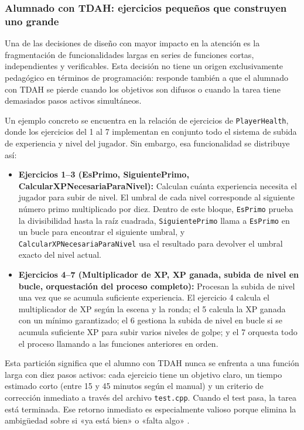 \documentclass[a4paper,12pt]{article}
\begin{document}
\subsubsection*{Alumnado con TDAH: ejercicios pequeños que construyen uno grande}


Una de las decisiones de diseño con mayor impacto en la atención es la fragmentación de funcionalidades largas en series de funciones cortas, independientes y verificables. Esta decisión no tiene un origen exclusivamente pedagógico en términos de programación: responde también a que el alumnado con TDAH se pierde cuando los objetivos son difusos o cuando la tarea tiene demasiados pasos activos simultáneos.


Un ejemplo concreto se encuentra en la relación de ejercicios de \texttt{PlayerHealth}, donde los ejercicios del 1 al 7 implementan en conjunto todo el sistema de subida de experiencia y nivel del jugador. Sin embargo, esa funcionalidad se distribuye así:


\begin{itemize}
  \item \textbf{Ejercicios 1--3 (EsPrimo, SiguientePrimo, CalcularXPNecesariaParaNivel):} Calculan cuánta experiencia necesita el jugador para subir de nivel. El umbral de cada nivel corresponde al siguiente número primo multiplicado por diez. Dentro de este bloque, \texttt{EsPrimo} prueba la divisibilidad hasta la raíz cuadrada, \texttt{SiguientePrimo} llama a \texttt{EsPrimo} en un bucle para encontrar el siguiente umbral, y \texttt{CalcularXPNecesariaParaNivel} usa el resultado para devolver el umbral exacto del nivel actual.
  \item \textbf{Ejercicios 4--7 (Multiplicador de XP, XP ganada, subida de nivel en bucle, orquestación del proceso completo):} Procesan la subida de nivel una vez que se acumula suficiente experiencia. El ejercicio 4 calcula el multiplicador de XP según la escena y la ronda; el 5 calcula la XP ganada con un mínimo garantizado; el 6 gestiona la subida de nivel en bucle si se acumula suficiente XP para subir varios niveles de golpe; y el 7 orquesta todo el proceso llamando a las funciones anteriores en orden.
\end{itemize}


Esta partición significa que el alumno con TDAH nunca se enfrenta a una función larga con diez pasos activos: cada ejercicio tiene un objetivo claro, un tiempo estimado corto (entre 15 y 45 minutos según el manual) y un criterio de corrección inmediato a través del archivo \texttt{test.cpp}. Cuando el test pasa, la tarea está terminada. Ese retorno inmediato es especialmente valioso porque elimina la ambigüedad sobre si «ya está bien» o «falta algo» \citep{dupaul2014adhd,hattie2007feedback}.
\end{document}
